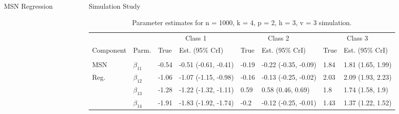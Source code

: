 \documentclass[final]{beamer}
\newlength{\onecolwid}
\newlength{\twocolwid}
\begin{document}
\begin{frame}[t]
\begin{columns}[t]
\begin{column}{\twocolwid}
\begin{columns}[t,totalwidth=\twocolwid]
\begin{column}{\onecolwid}
\begin{block}{MSN Regression}
\end{block}


\end{column} %

\begin{column}{\onecolwid} %


\begin{block}{Simulation Study}

\begin{table}[t]

\caption{\label{tab:unnamed-chunk-4}Parameter estimates for n = 1000, k = 4, p = 2, h = 3, v = 3 simulation.}
\centering
\fontsize{20}{20}\selectfont
\begin{tabular}{llllllll}
\toprule
\multicolumn{2}{c}{ } & \multicolumn{2}{c}{Class 1} & \multicolumn{2}{c}{Class 2} & \multicolumn{2}{c}{Class 3} \\
\cmidrule(l{3pt}r{3pt}){3-4} \cmidrule(l{3pt}r{3pt}){5-6} \cmidrule(l{3pt}r{3pt}){7-8}
Component & Parm. & True & Est. (95\% CrI) & True & Est. (95\% CrI) & True & Est. (95\% CrI)\\
\midrule
\addlinespace[0.3em]
\multicolumn{8}{l}{\textbf{ }}\\
\hspace{1em}MSN & $\beta_{11}$ & -0.54 & -0.51 (-0.61, -0.41) & -0.19 & -0.22 (-0.35, -0.09) & 1.84 & 1.81 (1.65, 1.99)\\
\hspace{1em}Reg. & $\beta_{12}$ & -1.06 & -1.07 (-1.15, -0.98) & -0.16 & -0.13 (-0.25, -0.02) & 2.03 & 2.09 (1.93, 2.23)\\
\hspace{1em} & $\beta_{13}$ & -1.28 & -1.22 (-1.32, -1.11) & 0.59 & 0.58 (0.46, 0.69) & 1.8 & 1.74 (1.58, 1.9)\\
\hspace{1em} & $\beta_{14}$ & -1.91 & -1.83 (-1.92, -1.74) & -0.2 & -0.12 (-0.25, -0.01) & 1.43 & 1.37 (1.22, 1.52)\\


\end{tabular}
\end{table}
\end{block}
\end{column}
\end{columns}
\end{column}
\end{columns}
\end{frame}
\end{document}
